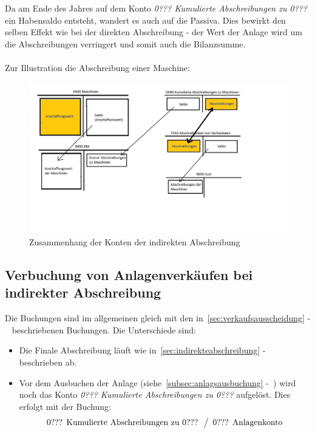 \documentclass[a4paper,10pt]{report}
\begin{document}
Da am Ende des Jahres auf dem Konto \textit{0??? Kumulierte
Abschreibungen zu 0???} ein Habensaldo entsteht, wandert es auch auf
die Passiva. Dies bewirkt den selben Effekt wie bei der direkten
Abschreibung - der Wert der Anlage wird um die Abschreibungen
verringert und somit auch die Bilanzsumme.\\
\\
Zur Illustration die Abschreibung einer Maschine:
\begin{figure}[ht]
\centering
\includegraphics[width=14cm]{Bilder/IndirekteAbschreibung-Konten_der_Bilanz}
\caption{Zusammenhang der Konten der indirekten Abschreibung}
\end{figure}

\subsection{Verbuchung von Anlagenverkäufen bei indirekter Abschreibung}
Die Buchungen sind im allgemeinen gleich mit den
in~\autoref{sec:verkaufsausscheidung}
-~ beschriebenen Buchungen. Die
Unterschiede sind:
\begin{itemize}
  \item { Die Finale Abschreibung läuft wie
in~\autoref{sec:indirekteabschreibung}
-~ beschrieben ab.
    }
  \item { Vor dem Ausbuchen der Anlage
(siehe~\autoref{subsec:anlagsausbuchung}
-~) wird noch das Konto \textit{0???
Kumulierte Abschreibungen zu 0???}  aufgelöst. Dies erfolgt mit der
Buchung:
\begin{equation*}
  \begin{array}{l}
    \text{0??? Kumulierte Abschreibungen zu 0???}\\
  \end{array}
  \left\slash
    \begin{array}{l}
      \text{0??? Anlagenkonto}\\
    \end{array}
  \right.
\end{equation*}
}
\end{itemize}
\end{document}
